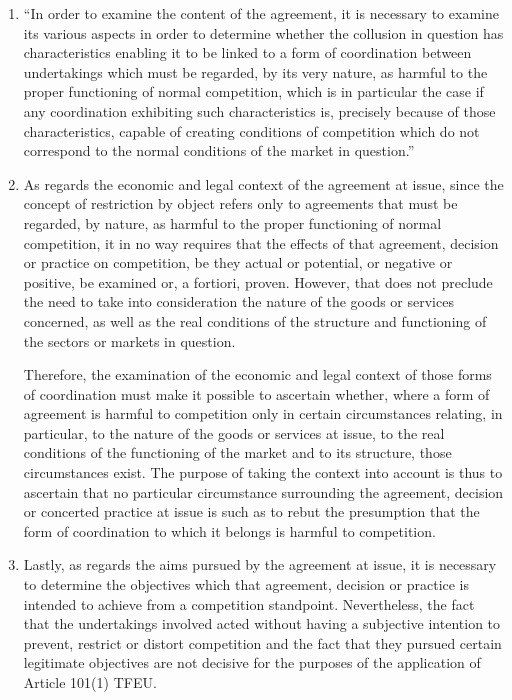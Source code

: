     \begin{enumerate}[label=\alph*.]
        \item “In order to examine the content of the agreement, it is necessary to examine its various aspects in order to determine whether the collusion in question has characteristics enabling it to be linked to a form of coordination between undertakings which must be regarded, by its very nature, as harmful to the proper functioning of normal competition, which is in particular the case if any coordination exhibiting such characteristics is, precisely because of those characteristics, capable of creating conditions of competition which do not correspond to the normal conditions of the market in question.”

        \item As regards the economic and legal context of the agreement at issue, since the concept of restriction by object refers only to agreements that must be regarded, by nature, as harmful to the proper functioning of normal competition, it in no way requires that the effects of that agreement, decision or practice on competition, be they actual or potential, or negative or positive, be examined or, a fortiori, proven. However, that does not preclude the need to take into consideration the nature of the goods or services concerned, as well as the real conditions of the structure and functioning of the sectors or markets in question.

        Therefore, the examination of the economic and legal context of those forms of coordination must make it possible to ascertain whether, where a form of agreement is harmful to competition only in certain circumstances relating, in particular, to the nature of the goods or services at issue, to the real conditions of the functioning of the market and to its structure, those circumstances exist. The purpose of taking the context into account is thus to ascertain that no particular circumstance surrounding the agreement, decision or concerted practice at issue is such as to rebut the presumption that the form of coordination to which it belongs is harmful to competition.

        \item Lastly, as regards the aims pursued by the agreement at issue, it is necessary to determine the objectives which that agreement, decision or practice is intended to achieve from a competition standpoint. Nevertheless, the fact that the undertakings involved acted without having a subjective intention to prevent, restrict or distort competition and the fact that they pursued certain legitimate objectives are not decisive for the purposes of the application of Article 101(1) TFEU.
        

\end{enumerate}
